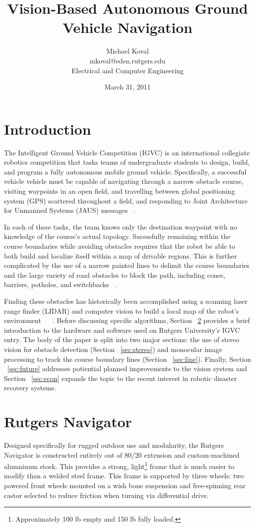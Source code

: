 \documentclass[11pt,twocolumn]{article}
\title{Vision-Based Autonomous Ground Vehicle Navigation}
\date{March 31, 2011}
\author{
	Michael Koval \\
	mkoval@eden.rutgers.edu \\
	Electrical and Computer Engineering
}
\begin{document}
\maketitle

\section{Introduction}
\label{sec:intro}
The Intelligent Ground Vehicle Competition (IGVC) is an international
collegiate robotics competition that tasks teams of undergraduate students to
design, build, and program a fully autonomous mobile ground vehicle.
Specifically, a successful vehicle vehicle must be capable of navigating
through a narrow obstacle course, visiting waypoints in an open field, and
travelling between global positioning system (GPS) scattered throughout a
field, and responding to Joint Architecture for Unmanned Systems (JAUS)
messages ~\cite{igvc11}.

In each of these tasks, the team knows only the destination waypoint with no
knowledge of the course's actual topology. Sucessfully remaining within the
course boundaries while avoiding obstacles requires that the robot be able to
both build and localize itself within a map of drivable regions. This is
further complicated by the use of a narrow painted lines to delimit the course
boundaries and the large variety of road obstacles to block the path, including
cones, barriers, potholes, and switchbacks ~\cite{igvc11}.

Finding these obstacles has historically been accomplished using a scanning
laser range finder (LIDAR) and computer vision to build a local map of the
robot's environment ~\cite{princeton08} ~\cite{delaware08}. Before discussing
specific algorithms, Section ~\ref{sec:robot} provides a brief introduction to
the hardware and software used on Rutgers University's IGVC entry. The body of
the paper is split into two major sections: the use of stereo vision for
obstacle detection (Section ~\ref{sec:stereo}) and monocular image processing
to track the course boundary lines (Section ~\ref{sec:line}). Finally, Section
~\ref{sec:future} addresses potiential planned improvements to the vision
system and Section ~\ref{sec:econ} expands the topic to the recent interest
in robotic disaster recovery systems.

\section{Rutgers Navigator}
\label{sec:robot}
Designed specifically for rugged outdoor use and modularity, the Rutgers
Navigator is constructed entirely out of 80/20 extrusion and custom-machined
alumninum stock. This provides a strong, light\footnote{Approximately 100 lb
empty and 150 lb fully loaded.} frame that is much
easier to modify than a welded steel frame. This frame is supported by three
wheels: two powered front wheels mounted on a wish bone suspension and
free-spinning rear castor selected to reduce friction when turning via
differential drive.
\end{document}
